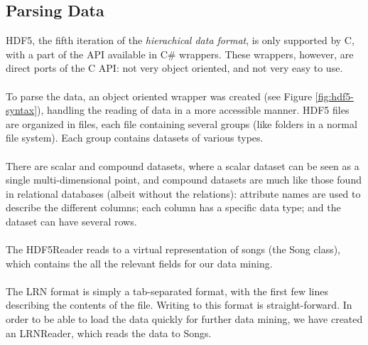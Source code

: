 \subsection{Parsing Data}
\label{sec:preprocessing_parsing}

HDF5, the fifth iteration of the \emph{hierachical data format}, is only supported by C, with a part of the API available
in C\# wrappers. These wrappers, however, are direct ports of the C API: not very object oriented, and not very easy to use.
\\\\
To parse the data, an object oriented wrapper was created (see Figure \ref{fig:hdf5-syntax}), handling the reading of data in a more accessible manner. HDF5 files
are organized in files, each file containing several groups (like folders in a normal file system). Each group contains
datasets of various types.
\\\\
There are scalar and compound datasets, where a scalar dataset can be seen as a single multi-dimensional point, and compound
datasets are much like those found in relational databases (albeit without the relations): attribute names are used to describe
the different columns; each column has a specific data type; and the dataset can have several rows.
\\\\
\noindent
The HDF5Reader reads to a virtual representation of songs (the Song class), which contains the all the relevant fields for our data
mining.
\\\\
The LRN format is simply a tab-separated format, with the first few lines describing the contents of the file. Writing to this format
is straight-forward. In order to be able to load the data quickly for further data mining, we have created an LRNReader, which reads
the data to Songs.
